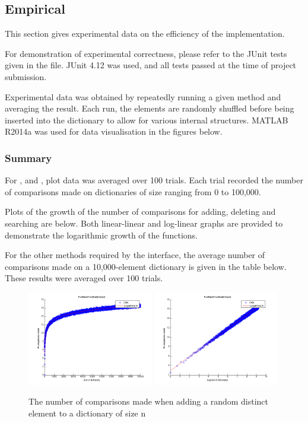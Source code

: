 \subsection{Empirical}

This section gives experimental data on the efficiency of the implementation.

For demonstration of experimental correctness, please refer to the JUnit tests given in the  file. JUnit 4.12 was used, and all tests passed at the time of project submission.

Experimental data was obtained by repeatedly running a given method and averaging the result. Each run, the elements are randomly shuffled before being inserted into the dictionary to allow for various internal structures. MATLAB R2014a was used for data visualisation in the figures below.

\subsubsection{Summary}
For ,  and , plot data was averaged over 100 trials. Each trial recorded the number of comparisons made on dictionaries of size ranging from 0 to 100,000.

Plots of the growth of the number of comparisons for adding, deleting and searching are below. Both linear-linear and log-linear graphs are provided to demonstrate the logarithmic growth of the functions.

For the other methods required by the  interface, the average number of comparisons made on a 10,000-element dictionary is given in the table below. These results were averaged over 100 trials.

\begin{figure}[!htbpp]
    \centering
    \includegraphics[width=0.49\textwidth]{resources/add}
    \includegraphics[width=0.49\textwidth]{resources/add_log}
    \caption{The number of comparisons made when adding a random distinct element to a dictionary of size n}

\end{figure}

